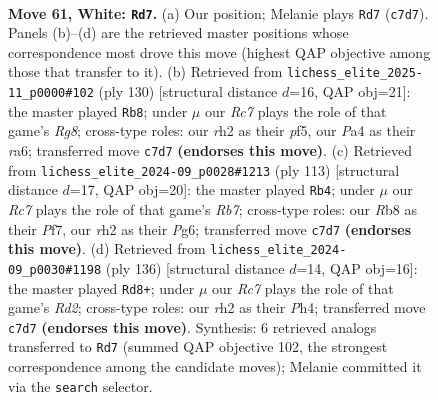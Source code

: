 \documentclass[11pt]{article}
\begin{document}
\clearpage

\begin{figure}[p]\centering
\begin{subfigure}{0.46\textwidth}\centering
\resizebox{\linewidth}{!}{%
\newchessgame
\chessboard[
  setfen={1R6/2R2p2/4pk2/8/P3PK2/5P2/7r/8 w - - 13 61},
  showmover=false,
  pgfstyle=straightmove, color=movearrow, markmove={c7-d7}
]}
\caption{}
\end{subfigure}\hfill
\begin{subfigure}{0.46\textwidth}\centering
\resizebox{\linewidth}{!}{%
\newchessgame
\chessboard[
  setfen={6R1/8/r4k2/5pp1/7p/7P/6PK/8 w - - 2 66},
  showmover=false,
  pgfstyle=straightmove, color=movearrow, markmove={g8-b8}
]}
\caption{}
\end{subfigure}
\\[4pt]
\begin{subfigure}{0.46\textwidth}\centering
\resizebox{\linewidth}{!}{%
\newchessgame
\chessboard[
  setfen={8/5pk1/6p1/7p/7P/R4KP1/1r3P2/8 b - - 30 57},
  showmover=false,
  pgfstyle=straightmove, color=movearrow, markmove={b2-b4}
]}
\caption{}
\end{subfigure}\hfill
\begin{subfigure}{0.46\textwidth}\centering
\resizebox{\linewidth}{!}{%
\newchessgame
\chessboard[
  setfen={6k1/5p2/8/4PK1p/5P1P/8/1p1R4/1r6 w - - 37 69},
  showmover=false,
  pgfstyle=straightmove, color=movearrow, markmove={d2-d8}
]}
\caption{}
\end{subfigure}
\caption{\textbf{Move 61, White: \texttt{Rd7}.} (a) Our position; Melanie plays \texttt{Rd7} (\texttt{c7d7}). Panels (b)--(d) are the retrieved master positions whose correspondence most drove this move (highest QAP objective among those that transfer to it). (b) Retrieved from \texttt{lichess\_elite\_2025-11\_p0000\#102} (ply 130) [structural distance $d$=16, QAP obj=21]: the master played \texttt{Rb8}; under $\mu$ our \emph{Rc7} plays the role of that game's \emph{Rg8}; cross-type roles: our \emph{r}h2 as their \emph{p}f5, our \emph{P}a4 as their \emph{r}a6; transferred move \texttt{c7d7} \textbf{(endorses this move)}. (c) Retrieved from \texttt{lichess\_elite\_2024-09\_p0028\#1213} (ply 113) [structural distance $d$=17, QAP obj=20]: the master played \texttt{Rb4}; under $\mu$ our \emph{Rc7} plays the role of that game's \emph{Rb7}; cross-type roles: our \emph{R}b8 as their \emph{P}f7, our \emph{r}h2 as their \emph{P}g6; transferred move \texttt{c7d7} \textbf{(endorses this move)}. (d) Retrieved from \texttt{lichess\_elite\_2024-09\_p0030\#1198} (ply 136) [structural distance $d$=14, QAP obj=16]: the master played \texttt{Rd8+}; under $\mu$ our \emph{Rc7} plays the role of that game's \emph{Rd2}; cross-type roles: our \emph{r}h2 as their \emph{P}h4; transferred move \texttt{c7d7} \textbf{(endorses this move)}. Synthesis: 6 retrieved analogs transferred to \texttt{Rd7} (summed QAP objective 102, the strongest correspondence among the candidate moves); Melanie committed it via the \texttt{search} selector.}
\label{fig:thought-m120}
\end{figure}
\end{document}
